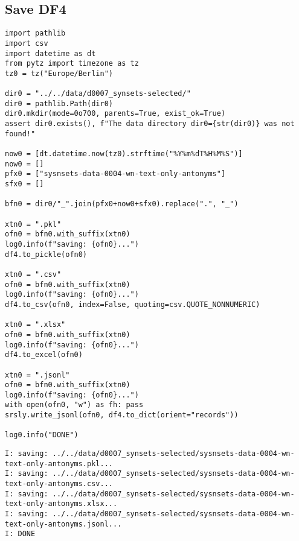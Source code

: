 \documentclass[a4paper,10pt,onecolumn,oneside,openright]{article}
\begin{document}
\subsection{Save DF4}
\label{sec:orgd070da0}
\begin{verbatim}
import pathlib
import csv
import datetime as dt
from pytz import timezone as tz
tz0 = tz("Europe/Berlin")

dir0 = "../../data/d0007_synsets-selected/"
dir0 = pathlib.Path(dir0)
dir0.mkdir(mode=0o700, parents=True, exist_ok=True)
assert dir0.exists(), f"The data directory dir0={str(dir0)} was not found!"

now0 = [dt.datetime.now(tz0).strftime("%Y%m%dT%H%M%S")]
now0 = []
pfx0 = ["sysnsets-data-0004-wn-text-only-antonyms"]
sfx0 = []

bfn0 = dir0/"_".join(pfx0+now0+sfx0).replace(".", "_")

xtn0 = ".pkl"
ofn0 = bfn0.with_suffix(xtn0)
log0.info(f"saving: {ofn0}...")
df4.to_pickle(ofn0)

xtn0 = ".csv"
ofn0 = bfn0.with_suffix(xtn0)
log0.info(f"saving: {ofn0}...")
df4.to_csv(ofn0, index=False, quoting=csv.QUOTE_NONNUMERIC)

xtn0 = ".xlsx"
ofn0 = bfn0.with_suffix(xtn0)
log0.info(f"saving: {ofn0}...")
df4.to_excel(ofn0)

xtn0 = ".jsonl"
ofn0 = bfn0.with_suffix(xtn0)
log0.info(f"saving: {ofn0}...")
with open(ofn0, "w") as fh: pass
srsly.write_jsonl(ofn0, df4.to_dict(orient="records"))

log0.info("DONE")
\end{verbatim}

\begin{verbatim}
I: saving: ../../data/d0007_synsets-selected/sysnsets-data-0004-wn-text-only-antonyms.pkl...
I: saving: ../../data/d0007_synsets-selected/sysnsets-data-0004-wn-text-only-antonyms.csv...
I: saving: ../../data/d0007_synsets-selected/sysnsets-data-0004-wn-text-only-antonyms.xlsx...
I: saving: ../../data/d0007_synsets-selected/sysnsets-data-0004-wn-text-only-antonyms.jsonl...
I: DONE
\end{verbatim}
\end{document}
